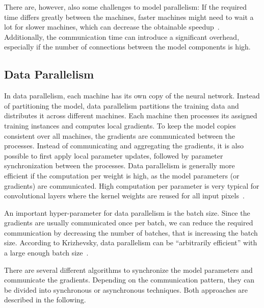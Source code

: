 \documentclass[conference]{IEEEtran}
\begin{document}
There are, however, also some challenges to model parallelism:
If the required time differs greatly between the machines, faster machines might need to wait a lot for slower machines, which can decrease the obtainable speedup~\cite{dean2012-Large-scale-distributed}.
Additionally, the communication time can introduce a significant overhead, especially if the number of connections between the model components is high.


\subsection{Data Parallelism} %
\label{sub:data_parallelism}

In data parallelism, each machine has its own copy of the neural network.
Instead of partitioning the model, data parallelism partitions the training data and distributes it across different machines.
Each machine then processes its assigned training instances and computes local gradients.
To keep the model copies consistent over all machines, the gradients are communicated between the processes.
Instead of communicating and aggregating the gradients, it is also possible to first apply local parameter updates, followed by parameter synchronization between the processes.
%
Data parallelism is generally more efficient if the computation per weight is high, as the model parameters (or gradients) are communicated.
High computation per parameter is very typical for convolutional layers where the kernel weights are reused for all input pixels~\cite{krizhevsky2014-One-weird-trick}.

An important hyper-parameter for data parallelism is the batch size.
Since the gradients are usually communicated once per batch, we can reduce the required communication by decreasing the number of batches, that is increasing the batch size.
According to Krizhevsky, data parallelism can be ``arbitrarily efficient'' with a large enough batch size~\cite{krizhevsky2014-One-weird-trick}.

There are several different algorithms to synchronize the model parameters and communicate the gradients.
Depending on the communication pattern, they can be divided into synchronous or asynchronous techniques.
Both approaches are described in the following.
\end{document}
